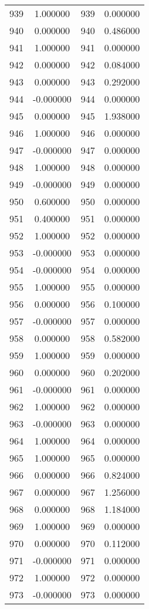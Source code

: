 \documentclass[12pt]{article}
\begin{document}
\begin{longtable}{@{}cccc@{}}
939 & 1.000000 & 939 & 0.000000 \\
940 & 0.000000 & 940 & 0.486000 \\
941 & 1.000000 & 941 & 0.000000 \\
942 & 0.000000 & 942 & 0.084000 \\
943 & 0.000000 & 943 & 0.292000 \\
944 & -0.000000 & 944 & 0.000000 \\
945 & 0.000000 & 945 & 1.938000 \\
946 & 1.000000 & 946 & 0.000000 \\
947 & -0.000000 & 947 & 0.000000 \\
948 & 1.000000 & 948 & 0.000000 \\
949 & -0.000000 & 949 & 0.000000 \\
950 & 0.600000 & 950 & 0.000000 \\
951 & 0.400000 & 951 & 0.000000 \\
952 & 1.000000 & 952 & 0.000000 \\
953 & -0.000000 & 953 & 0.000000 \\
954 & -0.000000 & 954 & 0.000000 \\
955 & 1.000000 & 955 & 0.000000 \\
956 & 0.000000 & 956 & 0.100000 \\
957 & -0.000000 & 957 & 0.000000 \\
958 & 0.000000 & 958 & 0.582000 \\
959 & 1.000000 & 959 & 0.000000 \\
960 & 0.000000 & 960 & 0.202000 \\
961 & -0.000000 & 961 & 0.000000 \\
962 & 1.000000 & 962 & 0.000000 \\
963 & -0.000000 & 963 & 0.000000 \\
964 & 1.000000 & 964 & 0.000000 \\
965 & 1.000000 & 965 & 0.000000 \\
966 & 0.000000 & 966 & 0.824000 \\
967 & 0.000000 & 967 & 1.256000 \\
968 & 0.000000 & 968 & 1.184000 \\
969 & 1.000000 & 969 & 0.000000 \\
970 & 0.000000 & 970 & 0.112000 \\
971 & -0.000000 & 971 & 0.000000 \\
972 & 1.000000 & 972 & 0.000000 \\
973 & -0.000000 & 973 & 0.000000 \\

\end{longtable}
\end{document}
